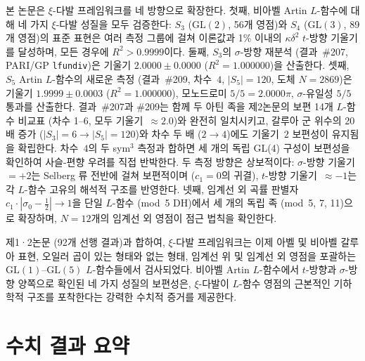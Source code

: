 \documentclass[11pt, a4paper]{article}
\theoremstyle{plain}
\theoremstyle{definition}
\newcommand{\abs}[1]{\left|#1\right|}
\newcommand{\kap}{\kappa}             %
\begin{document}
본 논문은 $\xi$-다발 프레임워크를 네 방향으로 확장한다.
첫째, 비아벨 Artin $L$-함수에 대해 네 가지 $\xi$-다발 성질을 모두 검증한다:
$S_{3}$ ($\mathrm{GL}(2)$, 56개 영점)와 $S_{4}$ ($\mathrm{GL}(3)$, 89개 영점)의
표준 표현은 여러 측정 그룹에 걸쳐 이론값과 1\% 이내의 $\kap\delta^{2}$
$t$-방향 기울기를 달성하며, 모든 경우에 $R^{2} > 0.9999$이다.
둘째, $S_{3}$의 $\sigma$-방향 재분석 (결과~\#207, PARI/GP \texttt{lfundiv})은
기울기 $2.0000\pm0.0000$ ($R^{2}=1.000000$)을 산출한다.
셋째, $S_{5}$ Artin $L$-함수의 새로운 측정 (결과~\#209, 차수~$4$, $|S_{5}|=120$,
도체 $N=2869$)은 기울기 $1.9999\pm0.0003$ ($R^{2}=1.000000$),
모노드로미 $5/5=2.0000\pi$, $\sigma$-유일성 $5/5$ 통과를 산출한다.
결과~\#207과 \#209는 함께 두 아틴 족을 제2논문의 보편 14개 $L$-함수 비교표
(차수 1--6, 모두 기울기~$\approx 2.0$)와 완전히 일치시키고,
갈루아 군 위수의 20배 증가 ($|S_{3}|=6 \to |S_{5}|=120$)와
차수 두 배 ($2 \to 4$)에도 기울기~$2$ 보편성이 유지됨을 확립한다.
차수~$4$의 두 sym$^{3}$ 측정과 합하면 세 개의 독립 GL(4) 구성이
보편성을 확인하여 사슬-편향 우려를 직접 반박한다.
두 측정 방향은 상보적이다: $\sigma$-방향 기울기~$=+2$는 Selberg 류 전반에
걸쳐 보편적이며 ($c_{1}=0$의 귀결), $t$-방향 기울기~$\approx{-1}$는
각 $L$-함수 고유의 해석적 구조를 반영한다.
넷째, 임계선 외 곡률 판별자 $c_{1}\cdot\abs{\sigma_{0}-\tfrac{1}{2}} \to 1$을
단일 $L$-함수 (mod~5 DH)에서 세 개의 독립 족 (mod~5, 7, 11)으로 확장하며,
$N=12$개의 임계선 외 영점이 점근 법칙을 확인한다.

제1·2논문 (92개 선행 결과)과 합하여, $\xi$-다발 프레임워크는 이제
아벨 및 비아벨 갈루아 표현, 오일러 곱이 있는 형태와 없는 형태,
임계선 위 및 임계선 외 영점을 포괄하는 $\mathrm{GL}(1)$--$\mathrm{GL}(5)$
$L$-함수들에서 검사되었다. 비아벨 Artin $L$-함수에서 $t$-방향과
$\sigma$-방향 양쪽으로 확인된 네 가지 성질의 보편성은,
$\xi$-다발이 $L$-함수 영점의 근본적인 기하학적 구조를 포착한다는
강력한 수치적 증거를 제공한다.


\appendix

\section{수치 결과 요약}
\label{app:summary}
\end{document}
